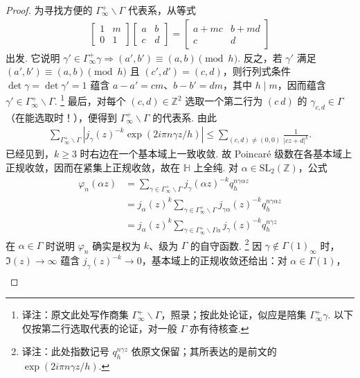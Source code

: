 \begin{proof}
为寻找方便的 $\Gamma_\infty^+\backslash\Gamma$ 代表系，从等式
\begin{align*}
\begin{bmatrix}1&m\\0&1\end{bmatrix}\begin{bmatrix}a&b\\c&d\end{bmatrix}=\begin{bmatrix}a+mc&b+md\\c&d\end{bmatrix}
\end{align*}
出发. 它说明 $\gamma'\in\Gamma_\infty^+\gamma\Rightarrow(a',b')\equiv(a,b)\pmod h$. 反之，若 $\gamma'$ 满足 $(a',b')\equiv(a,b)\pmod h$ 且 $(c',d')=(c,d)$，则行列式条件 $\det\gamma=\det\gamma'=1$ 蕴含 $a-a'=cm$、$b-b'=dm$，其中 $h\mid m$，因而蕴含 $\gamma'\in\Gamma_\infty^+\backslash\Gamma$.
\footnote{译注：原文此处写作商集 $\Gamma_\infty^+\backslash\Gamma$，照录；按此处论证，似应是陪集 $\Gamma_\infty^+\gamma$. 以下仅按第二行选取代表的论证，对一般 $\Gamma$ 亦有待核查.}
最后，对每个 $(c,d)\in\mathbb Z^2$ 选取一个第二行为 $(c\ d)$ 的 $\gamma_{c,d}\in\Gamma$（在能选取时！），便得到 $\Gamma_\infty^+\backslash\Gamma$ 的代表系. 由此
\begin{align*}
\sum_{\Gamma_\infty^+\backslash\Gamma}|j_\gamma(z)^{-k}\exp(2i\pi n\gamma z/h)|\leqslant\sum_{(c,d)\ne(0,0)}\frac{1}{|cz+d|^k}.
\end{align*}
已经见到，$k\geqslant3$ 时右边在一个基本域上一致收敛. 故 Poincaré 级数在各基本域上正规收敛，因而在紧集上正规收敛，故在 $\mathbb H$ 上全纯.
对 $\alpha\in\mathrm{SL}_2(\mathbb Z)$，公式
\begin{align*}
\varphi_n(\alpha z)&=\sum_{\gamma\in\Gamma_\infty^+\backslash\Gamma}j_\gamma(\alpha z)^{-k}q_h^{n\gamma\alpha z}\\
&=j_\alpha(z)^k\sum_{\gamma\in\Gamma_\infty^+\backslash\Gamma}j_{\gamma\alpha}(z)^{-k}q_h^{n\gamma\alpha z}\\
&=j_\alpha(z)^k\sum_{\gamma\in\Gamma_\infty^+\backslash\Gamma\alpha}j_\gamma(z)^{-k}q_h^{n\gamma z}
\end{align*}
在 $\alpha\in\Gamma$ 时说明 $\varphi_n$ 确实是权为 $k$、级为 $\Gamma$ 的自守函数.
\footnote{译注：此处指数记号 $q_h^{n\gamma z}$ 依原文保留；其所表达的是前文的 $\exp(2i\pi n\gamma z/h)$.}
因 $\gamma\notin\Gamma(1)_\infty$ 时，$\Im(z)\to\infty$ 蕴含 $j_\gamma(z)^{-k}\to0$，基本域上的正规收敛还给出：对 $\alpha\in\Gamma(1)$，
\begin{align*}

\end{align*}
\end{proof}
